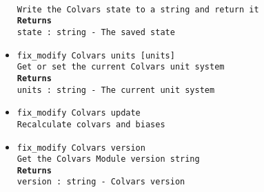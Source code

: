 \begin{itemize}
\\
\texttt{Write the Colvars state to a string and return it}
\\
\texttt{\textbf{Returns}}
\\
\texttt{state : string - The saved state}
\item \texttt{fix\_modify Colvars units [units]}
\\
\texttt{Get or set the current Colvars unit system}
\\
\texttt{\textbf{Returns}}
\\
\texttt{units : string - The current unit system}
\item \texttt{fix\_modify Colvars update}
\\
\texttt{Recalculate colvars and biases}
\item \texttt{fix\_modify Colvars version}
\\
\texttt{Get the Colvars Module version string}
\\
\texttt{\textbf{Returns}}
\\
\texttt{version : string - Colvars version}
\end{itemize}

